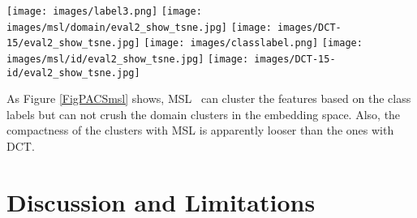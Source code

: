 \documentclass[a4paper,fleqn]{cas-dc}
\begin{document}
\begin{figure*}
{\begin{minipage}[b]{0.23\linewidth}
\texttt{[image: images/label3.png]}\vspace{1pt}
\texttt{[image: images/msl/domain/eval2\_show\_tsne.jpg]}\vspace{1pt}
\texttt{[image: images/DCT-15/eval2\_show\_tsne.jpg]}\vspace{1pt}
\texttt{[image: images/classlabel.png]}\vspace{1pt}
\texttt{[image: images/msl/id/eval2\_show\_tsne.jpg]}\vspace{1pt}
\texttt{[image: images/DCT-15-id/eval2\_show\_tsne.jpg]}
\end{minipage}}
\end{figure*}
As Figure \ref{FigPACSmsl} shows, MSL~\cite{MSL} can cluster the features based on the class labels but can not crush the domain clusters in the embedding space. Also, the compactness of the clusters with MSL is apparently looser than the ones with DCT.  \section{Discussion and Limitations}
\end{document}
